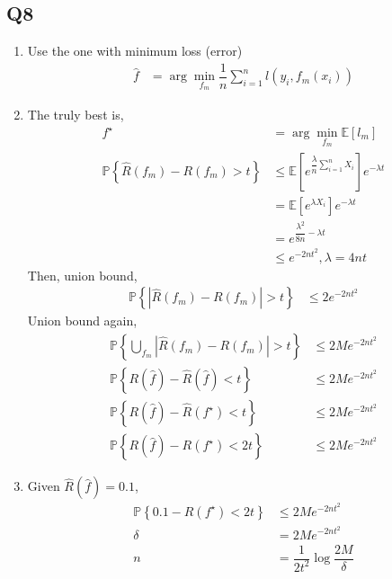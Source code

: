\documentclass{article}
\begin{document}
\subsection{Q8}
\begin{enumerate}
\item Use the one with minimum loss (error)
\begin{align*}
\hat{f} &= \arg\displaystyle\min_{f_{m}} \dfrac{1}{n} \displaystyle\sum_{i=1}^{n} l\left(y_{i}, f_{m}\left(x_{i}\right)\right)
\end{align*}
\item The truly best is,
\begin{align*}
f^\star  &= \arg\displaystyle\min_{f_{m}} \mathbb{E}\left[l_{m}\right]
\\ \mathbb{P}\left\{\hat{R}\left(f_{m}\right) - R\left(f_{m}\right) > t\right\} &\leq  \mathbb{E}\left[e^{\dfrac{\lambda}{n} \displaystyle\sum_{i=1}^{n} X_{i}}\right] e^{-\lambda t}
\\ &= \mathbb{E}\left[e^{\lambda X_{i}}\right] e^{-\lambda t}
\\ &= e^{\dfrac{\lambda^{2}}{8 n} - \lambda t}
\\ &\leq  e^{-2 n t^{2}}, \lambda = 4 n t 
\end{align*}
Then, union bound,
\begin{align*}
\mathbb{P}\left\{| \hat{R}\left(f_{m}\right) - R\left(f_{m}\right) | > t\right\} &\leq  2 e^{-2 n t^{2}}
\end{align*}
Union bound again,
\begin{align*}
\mathbb{P}\left\{\displaystyle\bigcup _{f_{m}} | \hat{R}\left(f_{m}\right) - R\left(f_{m}\right) | > t\right\} &\leq  2 M e^{-2 n t^{2}}
\\ \mathbb{P}\left\{R\left(\hat{f}\right) - \hat{R}\left(\hat{f}\right) < t\right\} &\leq  2 M e^{-2 n t^{2}}
\\ \mathbb{P}\left\{R\left(\hat{f}\right) - \hat{R}\left(f^\star \right) < t\right\} &\leq  2 M e^{-2 n t^{2}}
\\ \mathbb{P}\left\{R\left(\hat{f}\right) - R\left(f^\star \right) < 2 t\right\} &\leq  2 M e^{-2 n t^{2}}
\end{align*}
\item Given $\hat{R}\left(\hat{f}\right) = 0.1$,
\begin{align*}
\mathbb{P}\left\{0.1 - R\left(f^\star \right) < 2 t\right\} &\leq  2 M e^{-2 n t^{2}}
\\ \delta &= 2 M e^{-2 n t^{2}}
\\ n  &= \dfrac{1}{2 t^{2}} \log \dfrac{2 M}{\delta}
\end{align*}
\end{enumerate}
\end{document}
